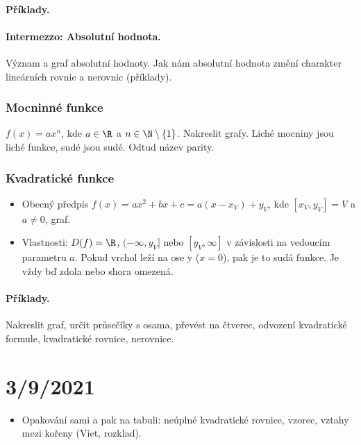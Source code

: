 \documentclass[11pt,a4paper]{article}
\begin{document}
                \paragraph*{Příklady.}

                \paragraph*{Intermezzo: Absolutní hodnota.} Význam a graf absolutní hodnoty. Jak nám absolutní hodnota změní charakter lineárních rovnic a nerovnic (příklady).

            \subsubsection*{Mocninné funkce}
                $f(x) = a x^n$, kde $a \in \R$ a $n \in \N \setminus \{1\}$. Nakreslit grafy. Liché mocniny jsou liché funkce, sudé jsou sudé. Odtud název parity.

            \subsubsection*{Kvadratické funkce}
                \begin{itemize}
                    \item Obecný předpis $f(x) = a x^2 + bx + c = a(x-x_V) + y_V$, kde $[x_V,y_V] = V$ a $a \neq 0$, graf.
                    \item Vlastnosti: $D(f) = \R$, $(-\infty, y_V]$ nebo $[y_V, \infty]$ v závislosti na vedoucím parametru $a$. Pokud vrchol leží na ose y ($x=0$), pak je to sudá funkce. Je vždy bď zdola nebo shora omezená.
                \end{itemize}
                \paragraph*{Příklady.} Nakreslit graf, určit průsečíky s osama, převést na čtverec, odvození kvadratické formule, kvadratické rovnice, nerovnice.
                
    \section*{3/9/2021}
        \begin{itemize}
            \item Opakování sami a pak na tabuli: neúplné kvadratické rovnice, vzorec, vztahy mezi kořeny (Viet, rozklad).
        \end{itemize}
\end{document}
